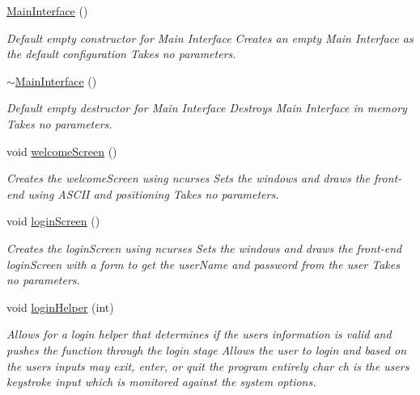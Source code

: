 \begin{DoxyCompactItemize}
\item 
\mbox{\hyperlink{class_main_interface_a0f52860dc811962028162a5842b796fc}{Main\+Interface}} ()
\begin{DoxyCompactList}\small\item\em Default empty constructor for Main Interface  Creates an empty Main Interface as the default configuration  Takes no parameters. \end{DoxyCompactList}\item 
\mbox{\hyperlink{class_main_interface_a30816483adcca651a0a01a232749e8ea}{$\sim$\+Main\+Interface}} ()
\begin{DoxyCompactList}\small\item\em Default empty destructor for Main Interface  Destroys Main Interface in memory  Takes no parameters. \end{DoxyCompactList}\item 
void \mbox{\hyperlink{class_main_interface_a8d6a94e88513e86f5dcbadf741bcac8b}{welcome\+Screen}} ()
\begin{DoxyCompactList}\small\item\em Creates the welcome\+Screen using ncurses  Sets the windows and draws the front-\/end using A\+S\+C\+II and positioning  Takes no parameters. \end{DoxyCompactList}\item 
void \mbox{\hyperlink{class_main_interface_a49a0a59ee12a2753ffe542f935e5b0fe}{login\+Screen}} ()
\begin{DoxyCompactList}\small\item\em Creates the login\+Screen using ncurses  Sets the windows and draws the front-\/end login\+Screen with a form to get the user\+Name and password from the user  Takes no parameters. \end{DoxyCompactList}\item 
void \mbox{\hyperlink{class_main_interface_a27867852cb6204a224608e273113fcec}{login\+Helper}} (int)
\begin{DoxyCompactList}\small\item\em Allows for a login helper that determines if the user\textquotesingle{}s information is valid and pushes the function through the login stage  Allows the user to login and based on the user\textquotesingle{}s inputs may exit, enter, or quit the program entirely  char ch is the user\textquotesingle{}s keystroke input which is monitored against the system options. \end{DoxyCompactList}\item 

\end{DoxyCompactItemize}
